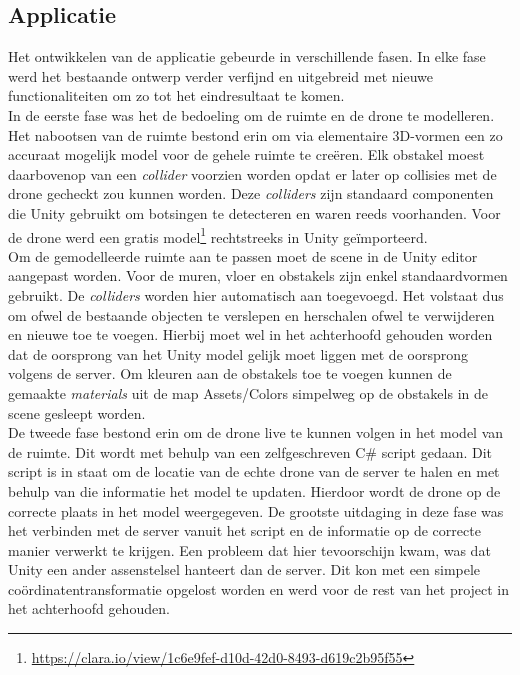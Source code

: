 \subsection{Applicatie} \label{sec:unity}
Het ontwikkelen van de applicatie gebeurde in verschillende fasen. In elke fase werd het bestaande ontwerp verder verfijnd en uitgebreid met nieuwe functionaliteiten om zo tot het eindresultaat te komen.\\

In de eerste fase was het de bedoeling om de ruimte en de drone te modelleren.
Het nabootsen van de ruimte bestond erin om via elementaire 3D-vormen een zo accuraat mogelijk model voor de gehele ruimte te cre\"eren.
Elk obstakel moest daarbovenop van een \textit{collider} voorzien worden opdat er later op collisies met de drone gecheckt zou kunnen worden.
Deze \textit{colliders} zijn standaard componenten die Unity gebruikt om botsingen te detecteren en waren reeds voorhanden.
Voor de drone werd een gratis model\footnote{\url{https://clara.io/view/1c6e9fef-d10d-42d0-8493-d619c2b95f55}} rechtstreeks in Unity geïmporteerd.\\

Om de gemodelleerde ruimte aan te passen moet de scene in de Unity editor aangepast worden. Voor de muren, vloer en obstakels zijn enkel standaardvormen gebruikt.
De \textit{colliders} worden hier automatisch aan toegevoegd.
Het volstaat dus om ofwel de bestaande objecten te verslepen en herschalen ofwel te verwijderen en nieuwe toe te voegen.
Hierbij moet wel in het achterhoofd gehouden worden dat de oorsprong van het Unity model gelijk moet liggen met de oorsprong volgens de server.
Om kleuren aan de obstakels toe te voegen kunnen de gemaakte \textit{materials} uit de map Assets/Colors simpelweg op de obstakels in de scene gesleept worden.\\

De tweede fase bestond erin om de drone live te kunnen volgen in het model van de ruimte.
Dit wordt met behulp van een zelfgeschreven C\# script gedaan.
Dit script is in staat om de locatie van de echte drone van de server te halen en met behulp van die informatie het model te updaten.
Hierdoor wordt de drone op de correcte plaats in het model weergegeven. De grootste uitdaging in deze fase was het verbinden met de server vanuit het script en de informatie op de correcte manier verwerkt te krijgen. Een probleem dat hier tevoorschijn kwam, was dat Unity een ander assenstelsel hanteert dan de server. Dit kon met een simpele coördinatentransformatie opgelost worden en werd voor de rest van het project in het achterhoofd gehouden.\\

